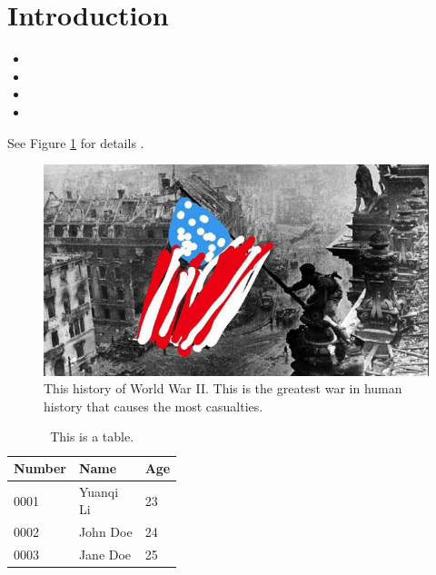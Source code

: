 \section{Introduction}
\label{sec:introudction}

\begin{itemize}
    \item {}
    \item {}
    \item {}
    \item {}
\end{itemize}

\lipsum[1]

See Figure \ref{fig:wwii} for details \cite{test:book,book:benson13}.

\begin{figure}[!ht]
    \centering
    \includegraphics[width=\textwidth]{images/wwii.jpg}
    \caption{This history of World War II. This is the greatest war in human history that causes the most casualties.}
    \label{fig:wwii}
\end{figure}

\begin{table}[!ht]
    \centering
    \begin{tabular}{lll} %
        \toprule \textbf{Number} & \textbf{Name} & \textbf{Age} \\
        \midrule 0001   & \makecell{Yuanqi\\Li} & 23  \\
        \midrule 0002   & John Doe  & 24  \\
        \midrule 0003   & Jane Doe  & 25  \\
        \bottomrule
    \end{tabular}
    \caption{This is a table.}
    \label{tab:table}
\end{table}

\lipsum[2]

\lipsum[3]
